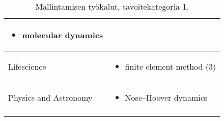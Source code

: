 \documentclass[utf8]{gradu3}
\begin{document}
\begin{longtable}[h]{|p{5cm}|p{8cm}|}
\begin{itemize}
        \item molecular dynamics
    \end{itemize} \\
    \hline
    Lifescience & \begin{itemize}
        \item finite element method (3)
    \end{itemize} \\
    \hline
    Physics and Astronomy & \begin{itemize}
        \item Nose–Hoover dynamics
    \end{itemize} \\
    \hline
    \caption{Mallintamisen työkalut, tavoitekategoria 1.}
    \label{table:mallintaminen 1.}
\end{longtable}

\pagebreak
\end{document}
